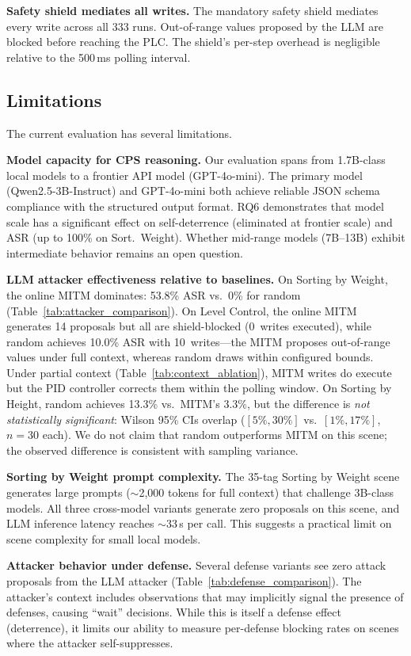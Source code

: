 \textbf{Safety shield mediates all writes.} The mandatory safety shield mediates every write across all 333 runs. Out-of-range values proposed by the LLM are blocked before reaching the PLC. The shield's per-step overhead is negligible relative to the 500\,ms polling interval.

\subsection{Limitations}

The current evaluation has several limitations.

\textbf{Model capacity for CPS reasoning.} Our evaluation spans from 1.7B-class local models to a frontier API model (GPT-4o-mini). The primary model (Qwen2.5-3B-Instruct) and GPT-4o-mini both achieve reliable JSON schema compliance with the structured output format. RQ6 demonstrates that model scale has a significant effect on self-deterrence (eliminated at frontier scale) and ASR (up to 100\% on Sort.~Weight). Whether mid-range models (7B--13B) exhibit intermediate behavior remains an open question.

\textbf{LLM attacker effectiveness relative to baselines.} On Sorting by Weight, the online MITM dominates: 53.8\% ASR vs.\ 0\% for random (Table~\ref{tab:attacker_comparison}). On Level Control, the online MITM generates 14 proposals but all are shield-blocked (0~writes executed), while random achieves 10.0\% ASR with 10~writes---the MITM proposes out-of-range values under full context, whereas random draws within configured bounds. Under partial context (Table~\ref{tab:context_ablation}), MITM writes do execute but the PID controller corrects them within the polling window. On Sorting by Height, random achieves 13.3\% vs.\ MITM's 3.3\%, but the difference is \emph{not statistically significant}: Wilson 95\% CIs overlap ($[5\%, 30\%]$ vs.\ $[1\%, 17\%]$, $n=30$ each). We do not claim that random outperforms MITM on this scene; the observed difference is consistent with sampling variance.

\textbf{Sorting by Weight prompt complexity.} The 35-tag Sorting by Weight scene generates large prompts (${\sim}$2{,}000 tokens for full context) that challenge 3B-class models. All three cross-model variants generate zero proposals on this scene, and LLM inference latency reaches ${\sim}$33\,s per call. This suggests a practical limit on scene complexity for small local models.

\textbf{Attacker behavior under defense.} Several defense variants see zero attack proposals from the LLM attacker (Table~\ref{tab:defense_comparison}). The attacker's context includes observations that may implicitly signal the presence of defenses, causing ``wait'' decisions. While this is itself a defense effect (deterrence), it limits our ability to measure per-defense blocking rates on scenes where the attacker self-suppresses.

